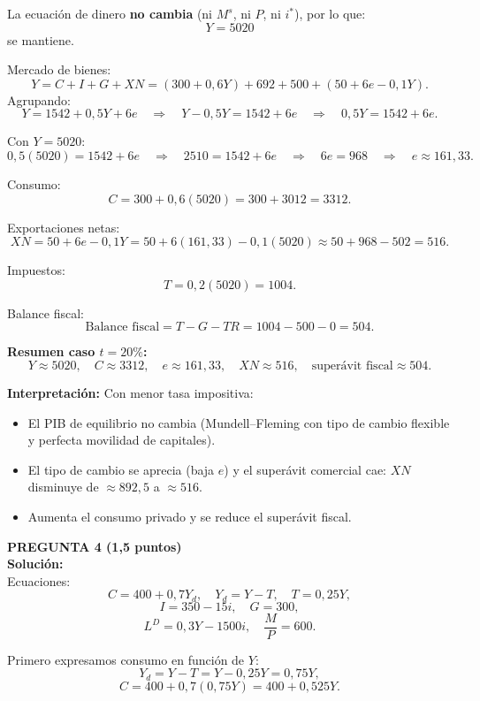 \documentclass[11pt,addpoints]{article}
\begin{document}
La ecuación de dinero \textbf{no cambia} (ni $M^s$, ni $P$, ni $i^*$), por lo que:
\[
Y = 5020
\]
se mantiene.

Mercado de bienes:
\[
Y = C + I + G + XN
= (300 + 0{,}6Y) + 692 + 500 + (50 + 6e - 0{,}1Y).
\]
Agrupando:
\[
Y = 1542 + 0{,}5Y + 6e
\quad\Rightarrow\quad
Y - 0{,}5Y = 1542 + 6e
\quad\Rightarrow\quad
0{,}5Y = 1542 + 6e.
\]

Con $Y = 5020$:
\[
0{,}5(5020) = 1542 + 6e
\quad\Rightarrow\quad
2510 = 1542 + 6e
\quad\Rightarrow\quad
6e = 968
\quad\Rightarrow\quad
e \approx 161{,}33.
\]

Consumo:
\[
C = 300 + 0{,}6(5020) = 300 + 3012 = 3312.
\]

Exportaciones netas:
\[
XN = 50 + 6e - 0{,}1Y
= 50 + 6(161{,}33) - 0{,}1(5020)
\approx 50 + 968 - 502 = 516.
\]

Impuestos:
\[
T = 0{,}2(5020) = 1004.
\]

Balance fiscal:
\[
\text{Balance fiscal} = T - G - TR = 1004 - 500 - 0 = 504.
\]

\textbf{Resumen caso $t=20\%$:}
\[
Y \approx 5020, \quad
C \approx 3312, \quad
e \approx 161{,}33, \quad
XN \approx 516, \quad
\text{superávit fiscal} \approx 504.
\]

\textbf{Interpretación:}  
Con menor tasa impositiva:
\begin{itemize}
  \item El PIB de equilibrio no cambia (Mundell–Fleming con tipo de cambio flexible y perfecta movilidad de capitales).
  \item El tipo de cambio se aprecia (baja $e$) y el superávit comercial cae: $XN$ disminuye de $\approx 892{,}5$ a $\approx 516$.
  \item Aumenta el consumo privado y se reduce el superávit fiscal.
\end{itemize}

\newpage
\vspace*{0.5cm}
\textbf{PREGUNTA 4 (1,5 puntos)}\\
\textbf{Solución:}\\

Ecuaciones:
\[
C = 400 + 0{,}7Y_d, \quad Y_d = Y - T, \quad T = 0{,}25Y,
\]
\[
I = 350 - 15i, \quad G = 300,
\]
\[
L^D = 0{,}3Y - 1500i, \quad \frac{M}{P} = 600.
\]

Primero expresamos consumo en función de $Y$:
\[
Y_d = Y - T = Y - 0{,}25Y = 0{,}75Y,
\]
\[
C = 400 + 0{,}7(0{,}75Y) = 400 + 0{,}525Y.
\]
\end{document}
